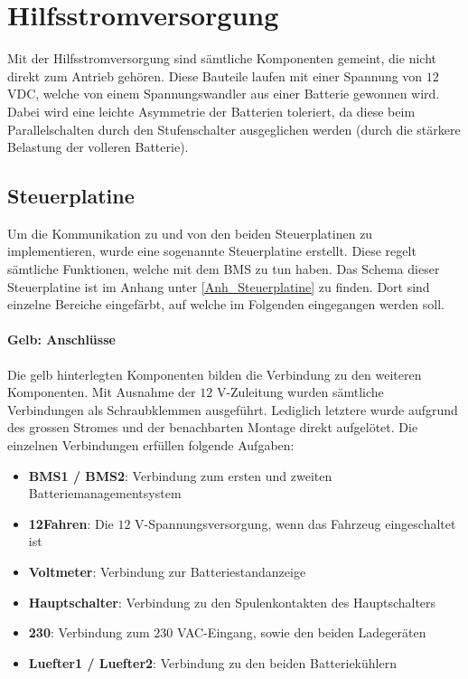 \section{Hilfsstromversorgung}
Mit der Hilfsstromversorgung sind sämtliche Komponenten gemeint, die nicht direkt zum Antrieb gehören. Diese Bauteile laufen mit einer Spannung von $12$ VDC, welche von einem Spannungswandler aus einer Batterie gewonnen wird. Dabei wird eine leichte Asymmetrie der Batterien toleriert, da diese beim Parallelschalten durch den Stufenschalter ausgeglichen werden (durch die stärkere Belastung der volleren Batterie).

\subsection{Steuerplatine}
Um die Kommunikation zu und von den beiden Steuerplatinen zu implementieren, wurde eine sogenannte Steuerplatine erstellt. Diese regelt sämtliche Funktionen, welche mit dem BMS zu tun haben. Das Schema dieser Steuerplatine ist im Anhang unter \ref{Anh_Steuerplatine} zu finden. Dort sind einzelne Bereiche eingefärbt, auf welche im Folgenden eingegangen werden soll.

\paragraph{Gelb: Anschlüsse}
Die gelb hinterlegten Komponenten bilden die Verbindung zu den weiteren Komponenten. Mit Ausnahme der $12$ V-Zuleitung wurden sämtliche Verbindungen als Schraubklemmen ausgeführt. Lediglich letztere wurde aufgrund des grossen Stromes und der benachbarten Montage direkt aufgelötet. Die einzelnen Verbindungen erfüllen folgende Aufgaben: \begin{itemize}
	\item \textbf{BMS1 / BMS2}: Verbindung zum ersten und zweiten Batteriemanagementsystem
	\item \textbf{12Fahren}: Die $12$ V-Spannungsversorgung, wenn das Fahrzeug eingeschaltet ist
	\item \textbf{Voltmeter}: Verbindung zur Batteriestandanzeige
	\item \textbf{Hauptschalter}: Verbindung zu den Spulenkontakten des Hauptschalters
	\item \textbf{230}: Verbindung zum $230$ VAC-Eingang, sowie den beiden Ladegeräten
	\item \textbf{Luefter1 / Luefter2}: Verbindung zu den beiden Batteriekühlern
\end{itemize}

